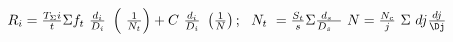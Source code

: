 \(R_i=\frac{T_{\Sigma}i}{t}\Sigma f_t\ \frac{d_i}{D_i}\ \left(\ \frac{1}{N_t}\right)+C\ \frac{d_i}{D_i}\ \left(\frac{1}{N}\right);\ \ N_t\ =\frac{S_t}{s}\Sigma\frac{d_s\ }{D_s\ \ }\ N=\frac{N_c}{j}\ \Sigma\ dj\frac{dj}{\Dj}\)
